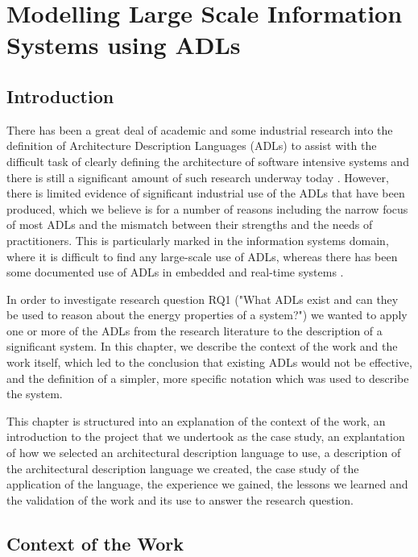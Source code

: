 \chapter{Modelling Large Scale Information Systems using ADLs}

\section{Introduction}

  There has been a great deal of academic and some industrial research into the definition of Architecture Description Languages (ADLs) to assist with the difficult task of clearly defining the architecture of software intensive systems and there is still a significant amount of such research underway today \cite{diruscio2010-byadl, cuenot2010-east, oquendo2004-piadl}.  However, there is limited evidence of significant industrial use of the ADLs that have been produced, which we believe is for a number of reasons \cite{bashroush2006-flexibleadls, woods2005-adlwg} including the narrow focus of most ADLs and the mismatch between their strengths and the needs of practitioners.  This is particularly marked in the information systems domain, where it is difficult to find any large-scale use of ADLs, whereas there has been some documented use of ADLs in embedded and real-time systems \cite{oquendo2004-piadl, vanommering2000-koala, allen2002-rtsystems}.

  In order to investigate research question RQ1 ("What ADLs exist and can they be used to reason about the energy properties of a system?") we wanted to apply one or more of the ADLs from the research literature to the description of a significant system.  In this chapter, we describe the context of the work and the work itself, which led to the conclusion that existing ADLs would not be effective, and the definition of a simpler, more specific notation which was used to describe the system.

  This chapter is structured into an explanation of the context of the work, an introduction to the project that we undertook as the case study, an explantation of how we selected an architectural description language to use, a description of the architectural description language we created, the case study of the application of the language, the experience we gained, the lessons we learned and the validation of the work and its use to answer the research question.

  \section{Context of the Work}

